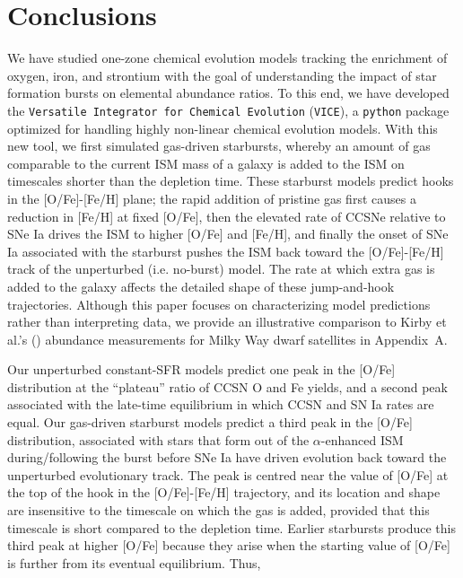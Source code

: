 
\section{Conclusions}
\label{bursts:sec:conclusion} 

We have studied one-zone chemical evolution models tracking the enrichment of 
oxygen, iron, and strontium with the goal of understanding the impact of star 
formation bursts on elemental abundance ratios. To this end, we have developed 
the \texttt{Versatile Integrator for Chemical Evolution} (\texttt{VICE}), a 
\texttt{python} package optimized for handling highly non-linear chemical 
evolution models. With this new tool, we first simulated gas-driven 
starbursts, whereby an amount of gas comparable to the current ISM mass of a 
galaxy is added to the ISM on timescales shorter than the depletion time. 
These starburst models predict hooks in the [O/Fe]-[Fe/H] plane; the rapid 
addition of pristine gas first causes a reduction in [Fe/H] at fixed [O/Fe], 
then the elevated rate of CCSNe relative to SNe Ia drives the ISM to higher 
[O/Fe] and [Fe/H], and finally the onset of SNe Ia associated with the 
starburst pushes the ISM back toward the [O/Fe]-[Fe/H] track of the unperturbed 
(i.e. no-burst) model. The rate at which extra gas is added to the galaxy 
affects the detailed shape of these jump-and-hook trajectories. 
Although this paper focuses on characterizing model predictions
rather than interpreting data, we provide an illustrative comparison to
Kirby et al.'s (\citeyear{Kirby2010}) abundance measurements for 
Milky Way dwarf satellites in Appendix~A.
\par 
Our unperturbed constant-SFR models predict one peak in the [O/Fe] distribution 
at the ``plateau'' ratio of CCSN O and Fe yields, and a second peak associated 
with the late-time equilibrium in which CCSN and SN Ia rates are equal. Our 
gas-driven starburst models predict a third peak in the [O/Fe] distribution, 
associated with stars that form out of the $\alpha$-enhanced ISM 
during/following the burst before SNe Ia have driven evolution back toward the 
unperturbed evolutionary track. The peak is centred near the value of [O/Fe] 
at the top of the hook in the [O/Fe]-[Fe/H] trajectory, and its location and 
shape are insensitive to the timescale on which the gas is added, provided 
that this timescale is short compared to the depletion time. Earlier 
starbursts produce this third peak at higher [O/Fe] because they arise when 
the starting value of [O/Fe] is further from its eventual equilibrium. Thus, 
